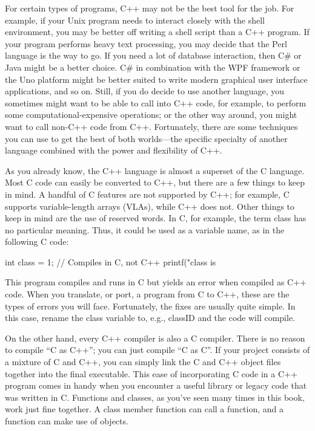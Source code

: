 
For certain types of programs, C++ may not be the best tool for the job. For example, if your Unix program needs to interact closely with the shell environment, you may be better off writing a shell script than a C++ program. If your program performs heavy text processing, you may decide that the Perl language is the way to go. If you need a lot of database interaction, then C\# or Java might be a better choice. C\# in combination with the WPF framework or the Uno platform might be better suited to write modern graphical user interface applications, and so on. Still, if you do decide to use another language, you sometimes might want to be able to call into C++ code, for example, to perform some computational-expensive operations; or the other way around, you might want to call non-C++ code from C++. Fortunately, there are some techniques you can use to get the best of both worlds—the specific specialty of another language combined with the power and flexibility of C++.


As you already know, the C++ language is almost a superset of the C language. Most C code can easily be converted to C++, but there are a few things to keep in mind. A handful of C features are not supported by C++; for example, C supports variable-length arrays (VLAs), while C++ does not. Other things to keep in mind are the use of reserved words. In C, for example, the term class has no particular meaning. Thus, it could be used as a variable name, as in the following C code:

\begin{cpp}
int class = 1; // Compiles in C, not C++
printf("class is %
\end{cpp}

This program compiles and runs in C but yields an error when compiled as C++ code. When you translate, or port, a program from C to C++, these are the types of errors you will face. Fortunately, the fixes are usually quite simple. In this case, rename the class variable to, e.g., classID and the code will compile.

On the other hand, every C++ compiler is also a C compiler. There is no reason to compile “C as C++”; you can just compile “C as C”. If your project consists of a mixture of C and C++, you can simply link the C and C++ object files together into the final executable. This ease of incorporating C code in a C++ program comes in handy when you encounter a useful library or legacy code that was written in C. Functions and classes, as you’ve seen many times in this book, work just fine together. A class member function can call a function, and a function can make use of objects.

